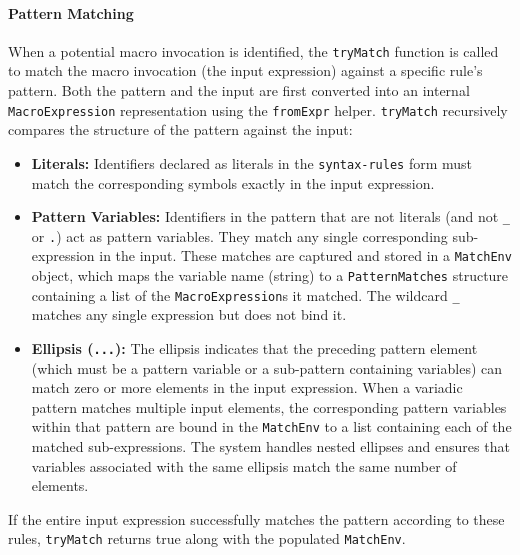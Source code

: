 \documentclass[final]{cmpreport_02}
\begin{document}
\paragraph{Pattern Matching}
When a potential macro invocation is identified, the \texttt{tryMatch} function is called to match the macro invocation (the input expression) against a specific rule's pattern. Both the pattern and the input are first converted into an internal \texttt{MacroExpression} representation using the \texttt{fromExpr} helper. \texttt{tryMatch} recursively compares the structure of the pattern against the input:
\begin{itemize}
    \item \textbf{Literals:} Identifiers declared as literals in the \texttt{syntax-rules} form must match the corresponding symbols exactly in the input expression.
    \item \textbf{Pattern Variables:} Identifiers in the pattern that are not literals (and not \texttt{\_} or \texttt{.}) act as pattern variables. They match any single corresponding sub-expression in the input. These matches are captured and stored in a \texttt{MatchEnv} object, which maps the variable name (string) to a \texttt{PatternMatches} structure containing a list of the \texttt{MacroExpression}s it matched. The wildcard \texttt{\_} matches any single expression but does not bind it.
    \item \textbf{Ellipsis (\texttt{...}):} The ellipsis indicates that the preceding pattern element (which must be a pattern variable or a sub-pattern containing variables) can match zero or more elements in the input expression. When a variadic pattern matches multiple input elements, the corresponding pattern variables within that pattern are bound in the \texttt{MatchEnv} to a list containing each of the matched sub-expressions. The system handles nested ellipses and ensures that variables associated with the same ellipsis match the same number of elements.
\end{itemize}
If the entire input expression successfully matches the pattern according to these rules, \texttt{tryMatch} returns true along with the populated \texttt{MatchEnv}.
\end{document}
